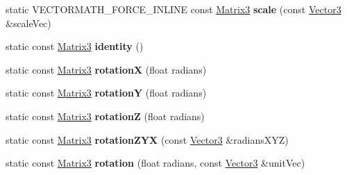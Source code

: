 \begin{DoxyCompactItemize}
\mbox{\label{classVectormath_1_1Aos_1_1Matrix3_a5499db3c15a95382e7e79021e15af4a8}} 
static V\+E\+C\+T\+O\+R\+M\+A\+T\+H\+\_\+\+F\+O\+R\+C\+E\+\_\+\+I\+N\+L\+I\+NE const \hyperlink{classVectormath_1_1Aos_1_1Matrix3}{Matrix3} {\bfseries scale} (const \hyperlink{classVectormath_1_1Aos_1_1Vector3}{Vector3} \&scale\+Vec)
\item 
\mbox{\label{classVectormath_1_1Aos_1_1Matrix3_aa3a7e66d9a5aecc02a17cfa47bc3d3e1}} 
static const \hyperlink{classVectormath_1_1Aos_1_1Matrix3}{Matrix3} {\bfseries identity} ()
\item 
\mbox{\label{classVectormath_1_1Aos_1_1Matrix3_a4a5b243ccd444e3aa8c016ed06779d0f}} 
static const \hyperlink{classVectormath_1_1Aos_1_1Matrix3}{Matrix3} {\bfseries rotationX} (float radians)
\item 
\mbox{\label{classVectormath_1_1Aos_1_1Matrix3_ae563e15673a4134de60f810f7601656a}} 
static const \hyperlink{classVectormath_1_1Aos_1_1Matrix3}{Matrix3} {\bfseries rotationY} (float radians)
\item 
\mbox{\label{classVectormath_1_1Aos_1_1Matrix3_ae084956aa6466766c0a8d9b964810a9b}} 
static const \hyperlink{classVectormath_1_1Aos_1_1Matrix3}{Matrix3} {\bfseries rotationZ} (float radians)
\item 
\mbox{\label{classVectormath_1_1Aos_1_1Matrix3_aea9868c1850dfa55a9119346006bddbd}} 
static const \hyperlink{classVectormath_1_1Aos_1_1Matrix3}{Matrix3} {\bfseries rotation\+Z\+YX} (const \hyperlink{classVectormath_1_1Aos_1_1Vector3}{Vector3} \&radians\+X\+YZ)
\item 
\mbox{\label{classVectormath_1_1Aos_1_1Matrix3_af5ced0bdea000fef2a59b5b04a91ef24}} 
static const \hyperlink{classVectormath_1_1Aos_1_1Matrix3}{Matrix3} {\bfseries rotation} (float radians, const \hyperlink{classVectormath_1_1Aos_1_1Vector3}{Vector3} \&unit\+Vec)
\item 
\mbox{\label{classVectormath_1_1Aos_1_1Matrix3_a16113123991ec12d265699105ace0e9c}} 

\end{DoxyCompactItemize}
